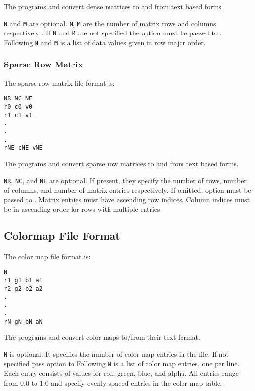 {The programs  and  
convert dense matrices to and from text based forms.

\verb|N| and \verb|M| are optional.  \verb|N|, \verb|M| are the number
of matrix rows and columns respectively .  If \verb|N| and \verb|M|
are not specified the  option must be
passed to .  Following \verb|N| and
\verb|M| is a list of data values given in row major order.


\subsubsection{Sparse Row Matrix}

The sparse row matrix file format is:

\begin{verbatim}
NR NC NE
r0 c0 v0
r1 c1 v1
.
.
.
rNE cNE vNE
\end{verbatim}

The programs  and
 convert sparse row matrices to and from
text based forms.

\verb|NR|, \verb|NC|, and \verb|NE| are optional.  If present, they
specify the number of rows, number of columns, and number of matrix
entries respectively.  If omitted, option  must be passed to .
Matrix entries must have ascending row indices. Column indices must be
in ascending order for rows with multiple entries.

\subsection{Colormap File Format}
\label{sec:colormap_fmt}

The color map file format is:

\begin{verbatim}
N
r1 g1 b1 a1
r2 g2 b2 a2
.
.
.
rN gN bN aN
\end{verbatim}

The programs  and 
convert color maps to/from their text format.

\verb|N| is optional.  It specifies the number of color map entries in
the file.  If not specified pass option  to
  Following \verb|N| is a list of color map
entries, one per line.  Each entry consists of values for red, green,
blue, and alpha.  All entries range from 0.0 to 1.0 and specify 
evenly spaced entries in the color map table.


}
